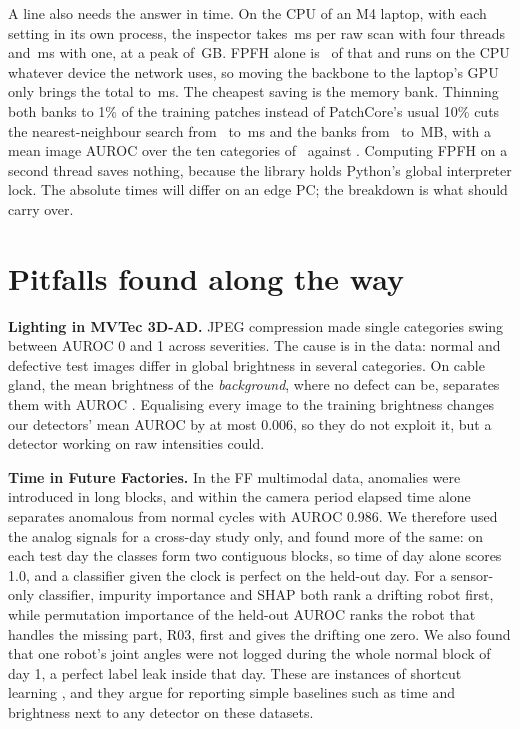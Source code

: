 \documentclass[10pt,twocolumn,letterpaper]{article}
\begin{document}
A line also needs the answer in time. On the CPU of an M4 laptop, with each setting in its own process, the inspector takes \cpuMs\,ms per raw scan with four threads and \cpuMsOne\,ms with one, at a peak of \peakGb\,GB. FPFH alone is \fpfhShare\ of that and runs on the CPU whatever device the network uses, so moving the backbone to the laptop's GPU only brings the total to \mpsMs\,ms. The cheapest saving is the memory bank. Thinning both banks to 1\% of the training patches instead of PatchCore's usual 10\% cuts the nearest-neighbour search from \searchTen\ to \searchOne\,ms and the banks from \bankTen\ to \bankOne\,MB, with a mean image AUROC over the ten categories of \aurocOne\ against \aurocTen. Computing FPFH on a second thread saves nothing, because the library holds Python's global interpreter lock. The absolute times will differ on an edge PC; the breakdown is what should carry over.

\section{Pitfalls found along the way}
\label{sec:pitfalls}

\textbf{Lighting in MVTec 3D-AD.} JPEG compression made single categories swing between AUROC 0 and 1 across severities. The cause is in the data: normal and defective test images differ in global brightness in several categories. On cable gland, the mean brightness of the \emph{background}, where no defect can be, separates them with AUROC \cableBackground. Equalising every image to the training brightness changes our detectors' mean AUROC by at most 0.006, so they do not exploit it, but a detector working on raw intensities could.

\textbf{Time in Future Factories.} In the FF multimodal data, anomalies were introduced in long blocks, and within the camera period elapsed time alone separates anomalous from normal cycles with AUROC 0.986. We therefore used the analog signals for a cross-day study only, and found more of the same: on each test day the classes form two contiguous blocks, so time of day alone scores 1.0, and a classifier given the clock is perfect on the held-out day. For a sensor-only classifier, impurity importance and SHAP both rank a drifting robot first, while permutation importance of the held-out AUROC ranks the robot that handles the missing part, R03, first and gives the drifting one zero. We also found that one robot's joint angles were not logged during the whole normal block of day 1, a perfect label leak inside that day. These are instances of shortcut learning \citep{geirhos2020shortcut}, and they argue for reporting simple baselines such as time and brightness next to any detector on these datasets.
\end{document}
